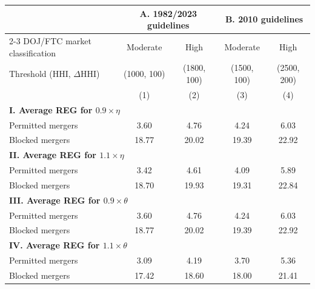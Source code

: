 \begin{tabular}{l @{\hspace{1em}} cc @{\hspace{3em}} cc}
\toprule
 & \multicolumn{2}{c}{\textbf{A. 1982/2023 guidelines}} & \multicolumn{2}{c}{\textbf{B. 2010 guidelines}} \\ 
\cmidrule{2-3}
\cmidrule{4-5}
DOJ/FTC market classification & Moderate & High & Moderate & High \\ 
Threshold (HHI, $\Delta$HHI) & (1000,  100) & (1800, 100) & (1500, 100) & (2500, 200) \\ 
 & (1) & (2) & (3) & (4) \\ 
\midrule
\multicolumn{5}{l}{\textbf{I. Average REG for $0.9 \times \eta$}} \\ 
Permitted mergers & 3.60 & 4.76 & 4.24 & 6.03 \\ 
Blocked mergers & 18.77 & 20.02 & 19.39 & 22.92 \\ 
\midrule
\multicolumn{5}{l}{\textbf{II. Average REG for $1.1 \times \eta$}} \\ 
Permitted mergers & 3.42 & 4.61 & 4.09 & 5.89 \\ 
Blocked mergers & 18.70 & 19.93 & 19.31 & 22.84 \\ 
\midrule
\multicolumn{5}{l}{\textbf{III. Average REG for $0.9 \times \theta$}} \\ 
Permitted mergers & 3.60 & 4.76 & 4.24 & 6.03 \\ 
Blocked mergers & 18.77 & 20.02 & 19.39 & 22.92 \\ 
\midrule
\multicolumn{5}{l}{\textbf{IV. Average REG for $1.1 \times \theta$}} \\ 
Permitted mergers & 3.09 & 4.19 & 3.70 & 5.36 \\ 
Blocked mergers & 17.42 & 18.60 & 18.00 & 21.41 \\ 
\bottomrule 
\end{tabular}